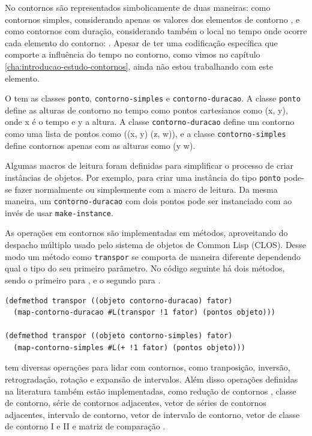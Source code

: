 No \goiaba{} contornos são representados simbolicamente de duas
maneiras: como contornos simples, considerando apenas os valores dos
elementos de contorno , e como contornos com duração,
considerando também o local no tempo onde ocorre cada elemento do
contorno: . Apesar de ter uma codificação
específica que comporte a influência do tempo no contorno, como vimos
no capítulo \ref{cha:introducao-estudo-contornos}, ainda não estou
trabalhando com este elemento.

O \goiaba{} tem as classes \texttt{ponto}, \texttt{contorno-simples} e
\texttt{contorno-duracao}. A classe \texttt{ponto} define as alturas
de contorno no tempo como pontos cartesianos como (x, y), onde x é o
tempo e y a altura. A classe \texttt{contorno-duracao} define um
contorno como uma lista de pontos como ((x, y) (z, w)), e a classe
\texttt{contorno-simples} define contornos apenas com as alturas como
(y w).

Algumas macros de leitura foram definidas para simplificar o processo
de criar instâncias de objetos. Por exemplo, para criar uma instância
do tipo \texttt{ponto} pode-se fazer normalmente  ou simplesmente  com a macro de
leitura. Da mesma maneira, um \texttt{contorno-duracao} com dois
pontos pode ser instanciado com  ao invés
de usar \texttt{make-instance}.

As operações em contornos são implementadas em métodos, aproveitando
do despacho múltiplo usado pelo sistema de objetos de Common Lisp
(CLOS). Desse modo um método como \texttt{transpor} se comporta de
maneira diferente dependendo qual o tipo do seu primeiro parâmetro. No
código seguinte há dois métodos, sendo o primeiro para
, e o segundo para .

\break

\singlespacing
\begin{verbatim}
(defmethod transpor ((objeto contorno-duracao) fator)
  (map-contorno-duracao #L(transpor !1 fator) (pontos objeto)))

(defmethod transpor ((objeto contorno-simples) fator)
  (map-contorno-simples #L(+ !1 fator) (pontos objeto)))
\end{verbatim}
\doublespacing

\goiaba{} tem diversas operações para lidar com contornos, como
tranposição, inversão, retrogradação, rotação e expansão de
intervalos. Além disso operações definidas na literatura também estão
implementadas, como redução de contornos \cite{adams76:melodic},
classe de contorno, série de contornos adjacentes, vetor de séries de
contornos adjacentes, intervalo de contorno, vetor de intervalo de
contorno, vetor de classe de contorno I e II
\cite{friedmann85:methodology} e matriz de comparação
\cite{morris93:directions}.

